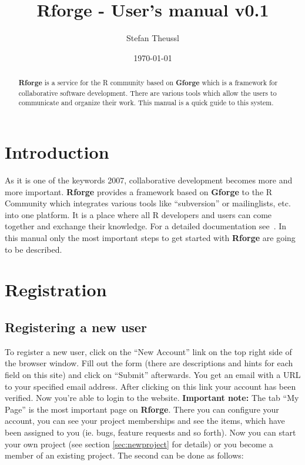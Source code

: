 \documentclass[a4paper]{article}
\title{Rforge - User's manual v0.1}
\author{Stefan Theussl}
\date{\today}
\begin{document}
\maketitle

\begin{abstract}
\textbf{Rforge} is a service for the R community based on
\textbf{Gforge} which is a framework for collaborative software
development. There are various tools which allow the users to
communicate and organize their work. This manual is a quick guide to
this system.
\end{abstract}

\tableofcontents

\newpage
\section{Introduction}
\label{sec:intro}
As it is one of the keywords 2007, collaborative development becomes
more and more important. \textbf{Rforge} provides a framework based on
\textbf{Gforge} to the R Community which integrates various tools like
``subversion'' or mailinglists, etc. into one platform. It is a
place where all R developers and users can come together and exchange
their knowledge. For a detailed documentation
see~\cite{manual:gforge}. In this manual only the most important steps to get
started with \textbf{Rforge} are going to be described. 

\section{Registration}
\label{sec:registration}

\subsection{Registering a  new user}
To register a new user, click on the ``New Account'' link on the top
right side of the browser window.
Fill out the form (there are descriptions and hints for each field on
this site) and click on ``Submit'' afterwards. You get an email with
a URL to your specified email address. After clicking on this link
your account has been verified. Now you're able to login to the
website.
\newline
\textbf{Important note:} The tab ``My Page'' is the most important
page on \textbf{Rforge}. There you can configure your account, you can see your
project memberships and see the items, which have been assigned to you
(ie. bugs, feature requests and so forth).
\newline
Now you can start your own project (see section \ref{sec:newproject}
for details) or you become a member of an existing project. The second
can be done as follows:
\end{document}
